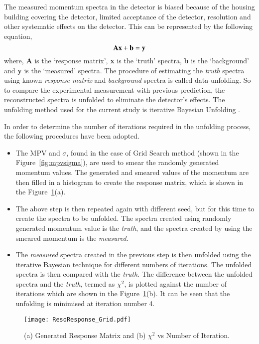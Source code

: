 The measured momentum spectra in the detector is biased
because of the housing building covering the detector, limited
acceptance of the detector, resolution and other systematic effects
on the detector. This can be represented by the following equation,
\begin{equation}
  {\bf A}{\bf x}+{\bf b}={\bf y}
  \label{eq:unfold}
\end{equation}
where, {\bf A} is the `response matrix', {\bf x} is the `truth' spectra,
{\bf b} is the `background' and {\bf y} is the `measured' spectra.
The procedure of estimating the {\it truth} spectra using known
{\it response matrix} and {\it background} spectra is called
data-unfolding. So to compare the experimental measurement with
previous prediction, the reconstructed spectra is unfolded to eliminate
the detector's effects.
The unfolding method used for the current
study is iterative Bayesian Unfolding \cite{bayesian}.

In order to determine the number of iterations required in the
unfolding process, the following procedures have been adopted.
\begin{itemize} %
\item The MPV and $\sigma$, found in the case of Grid Search method
  (shown in the Figure~\ref{fig:mpvsigma}), are used to smear
  the randomly generated momentum values. The generated and smeared
  values of the momentum are then filled in a histogram to create
  the response matrix, which is shown in the
  Figure~\ref{fig:unfolditer}(a).
\item The above step is then repeated again with different seed,
  but for this time to create the spectra to be unfolded. The spectra
  created using randomly generated momentum value is the {\it truth},
  and the spectra created by using the smeared momentum is the
  {\it measured}.
\item The {\it measured} spectra created in the previous step is then
  unfolded using the iterative Bayesian technique for different numbers
  of iterations. The unfolded spectra is then compared with the
  {\it truth}. The difference between the unfolded spectra and the
  {\it truth}, termed as $\chi^{2}$, is plotted against the number of
  iterations which are shown in the Figure~\ref{fig:unfolditer}(b).
  It can be seen that the unfolding is minimised at iteration number 4.
\end{itemize}
\begin{figure}[h]
  \centering
  \texttt{[image: ResoResponse\_Grid.pdf]}
  \caption{(a) Generated Response Matrix and
    (b) $\chi^{2}$ vs Number of Iteration.}
  \label{fig:unfolditer}
\end{figure}

